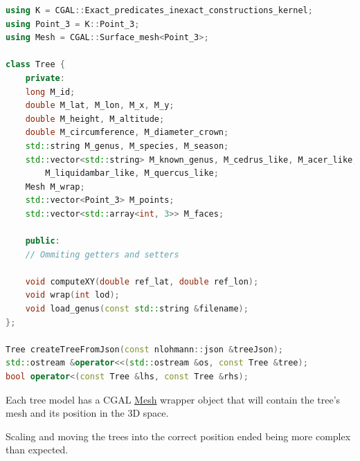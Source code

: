 \documentclass[12pt]{article}
\begin{document}
\begin{lstlisting}[language=C++]
using K = CGAL::Exact_predicates_inexact_constructions_kernel;
using Point_3 = K::Point_3;
using Mesh = CGAL::Surface_mesh<Point_3>;

class Tree {
    private:
    long M_id;
    double M_lat, M_lon, M_x, M_y;
    double M_height, M_altitude;
    double M_circumference, M_diameter_crown;
    std::string M_genus, M_species, M_season;
    std::vector<std::string> M_known_genus, M_cedrus_like, M_acer_like,
        M_liquidambar_like, M_quercus_like;
    Mesh M_wrap;
    std::vector<Point_3> M_points;
    std::vector<std::array<int, 3>> M_faces;

    public:
    // Ommiting getters and setters

    void computeXY(double ref_lat, double ref_lon);
    void wrap(int lod);
    void load_genus(const std::string &filename);
};

Tree createTreeFromJson(const nlohmann::json &treeJson);
std::ostream &operator<<(std::ostream &os, const Tree &tree);
bool operator<(const Tree &lhs, const Tree &rhs);
\end{lstlisting}

Each tree model has a CGAL \href{https://doc.cgal.org/latest/Surface_mesh/classCGAL_1_1Surface__mesh.html}{Mesh}
wrapper object that will contain the tree's
mesh and its position in the 3D space.

Scaling and moving the trees into the correct position ended being more complex
than expected.
\end{document}
